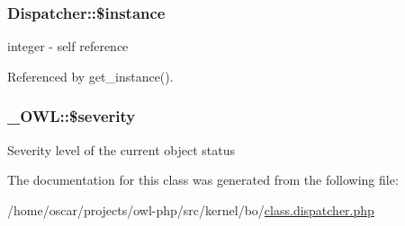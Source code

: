 \subsubsection[{\$instance}]{\setlength{\rightskip}{0pt plus 5cm}Dispatcher::\$instance}\label{classDispatcher_a676b77546f23eb5bae93d28362664eb8}
integer -\/ self reference 

Referenced by get\_\-instance().

\subsubsection[{\$severity}]{\setlength{\rightskip}{0pt plus 5cm}\_\-OWL::\$severity}\label{class__OWL_ad26b40a9dbbacb33e299b17826f8327c}
Severity level of the current object status 

The documentation for this class was generated from the following file:\begin{DoxyCompactItemize}
\item 
/home/oscar/projects/owl-\/php/src/kernel/bo/\hyperlink{class_8dispatcher_8php}{class.dispatcher.php}\end{DoxyCompactItemize}
